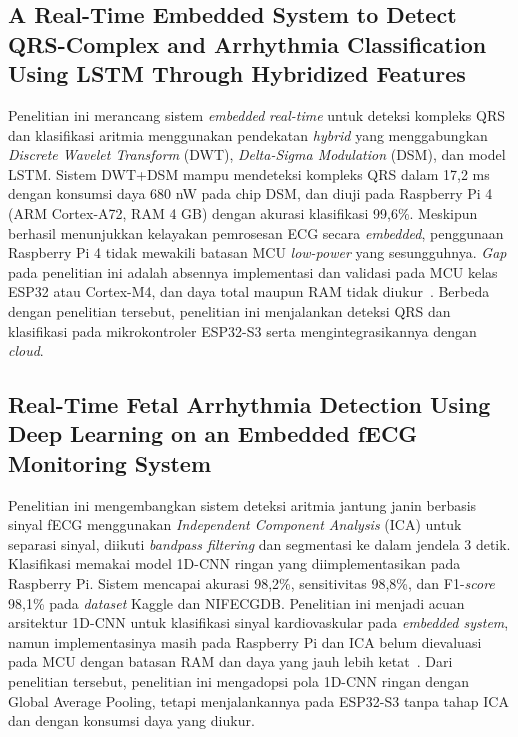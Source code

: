 \subsection{A Real-Time Embedded System to Detect QRS-Complex and Arrhythmia Classification Using LSTM Through Hybridized Features}
\label{subsec:related-karri2023}

Penelitian ini merancang sistem \textit{embedded} \textit{real-time} untuk deteksi kompleks QRS dan klasifikasi aritmia menggunakan pendekatan \textit{hybrid} yang menggabungkan \textit{Discrete Wavelet Transform} (DWT), \textit{Delta-Sigma Modulation} (DSM), dan model LSTM. Sistem DWT+DSM mampu mendeteksi kompleks QRS dalam 17,2 ms dengan konsumsi daya 680 nW pada chip DSM, dan diuji pada Raspberry Pi 4 (ARM Cortex-A72, RAM 4 GB) dengan akurasi klasifikasi 99,6\%. Meskipun berhasil menunjukkan kelayakan pemrosesan ECG secara \textit{embedded}, penggunaan Raspberry Pi 4 tidak mewakili batasan MCU \textit{low-power} yang sesungguhnya. \textit{Gap} pada penelitian ini adalah absennya implementasi dan validasi pada MCU kelas ESP32 atau Cortex-M4, dan daya total maupun RAM tidak diukur~\cite{karri_2023}. Berbeda dengan penelitian tersebut, penelitian ini menjalankan deteksi QRS dan klasifikasi pada mikrokontroler ESP32-S3 serta mengintegrasikannya dengan \textit{cloud}.

\subsection{Real-Time Fetal Arrhythmia Detection Using Deep Learning on an Embedded fECG Monitoring System}
\label{subsec:related-mekhfioui2025}

Penelitian ini mengembangkan sistem deteksi aritmia jantung janin berbasis sinyal fECG menggunakan \textit{Independent Component Analysis} (ICA) untuk separasi sinyal, diikuti \textit{bandpass filtering} dan segmentasi ke dalam jendela 3 detik. Klasifikasi memakai model 1D-CNN ringan yang diimplementasikan pada Raspberry Pi. Sistem mencapai akurasi 98,2\%, sensitivitas 98,8\%, dan F1-\textit{score} 98,1\% pada \textit{dataset} Kaggle dan NIFECGDB. Penelitian ini menjadi acuan arsitektur 1D-CNN untuk klasifikasi sinyal kardiovaskular pada \textit{embedded system}, namun implementasinya masih pada Raspberry Pi dan ICA belum dievaluasi pada MCU dengan batasan RAM dan daya yang jauh lebih ketat~\cite{mekhfioui_2025}. Dari penelitian tersebut, penelitian ini mengadopsi pola 1D-CNN ringan dengan Global Average Pooling, tetapi menjalankannya pada ESP32-S3 tanpa tahap ICA dan dengan konsumsi daya yang diukur.

